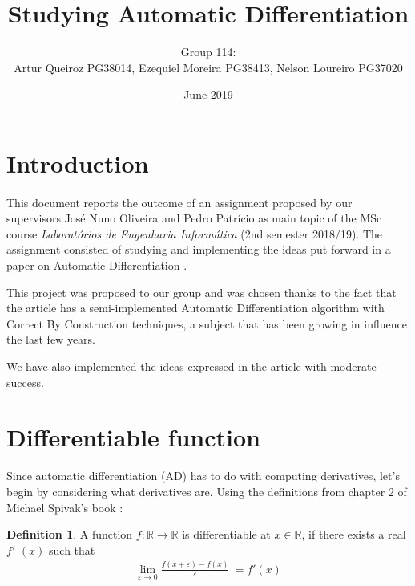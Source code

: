 \documentclass[11pt,a4]{article}
\title{Studying Automatic Differentiation}
\author{Group 114:\\
	Artur Queiroz PG38014, Ezequiel Moreira PG38413, Nelson Loureiro PG37020}
\date{June 2019}
\def\R{\mathbb{R}}
\theoremstyle{definition}
\newtheorem{defi}{Definition}[section]
\theoremstyle{Definition}
\theoremstyle{Definition}
\begin{document}
	
	\maketitle
	
	\section{Introduction}
	\paragraph{} 
This document reports the outcome of an assignment proposed by our supervisors José Nuno Oliveira and Pedro Patrício as main topic of the MSc course \emph{Laboratórios de Engenharia Informática} (2nd semester 2018/19). The assignment consisted of studying and implementing the ideas put forward in a paper on Automatic Differentiation \cite{Elliott:2018}.

This project was proposed to our group and was chosen thanks to the fact that the article has a semi-implemented Automatic Differentiation algorithm with Correct By Construction techniques, a subject that has been growing in influence the last few years. 
	\par We have also implemented the ideas expressed in the article with moderate success.
	
	
	
\section{Differentiable function}
	
	Since automatic differentiation (AD) has to do with computing derivatives, let’s begin by considering
	what derivatives are. Using the definitions from chapter 2 of Michael Spivak's book \cite{book}:
	
	\begin{defi}
		A function $f:\R \to \R$ is differentiable at $x \in \R$, if there exists a real \newline $f $$'$ $(x)$ such that
		\begin{align*}
		\lim_{\varepsilon \to 0} \frac{\textit{$f(x+\varepsilon)-f(x)$}}{\varepsilon} \ = \textit{$f'(x)$}  
		\end{align*}
	\end{defi}
	
\end{document}
